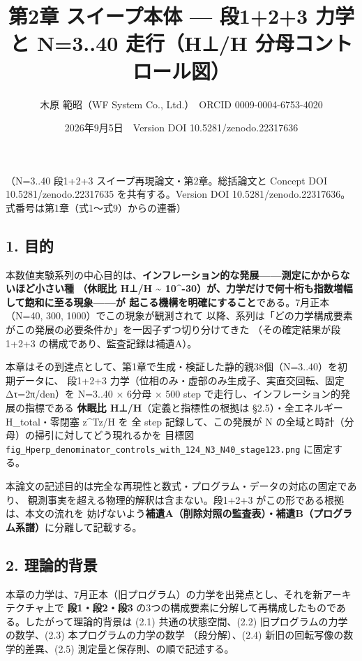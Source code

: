 \documentclass[
  a4paper,
]{ltjsarticle}
\title{第2章 スイープ本体 --- 段1+2+3 力学と N=3..40 走行（H⊥/H
分母コントロール図）}
\author{木原 範昭（WF System Co., Ltd.）　ORCID 0009-0004-6753-4020}
\date{2026年9月5日　Version DOI 10.5281/zenodo.22317636}
\begin{document}
\maketitle

（N=3..40 段1+2+3 スイープ再現論文・第2章。総括論文と Concept DOI
10.5281/zenodo.22317635 を共有する。Version DOI
10.5281/zenodo.22317636。 式番号は第1章（式1〜式9）からの連番）

\subsection{1. 目的}\label{ux76eeux7684}

本数値実験系列の中心目的は、\textbf{インフレーション的な発展------測定にかからないほど小さい種
（休眠比 H⊥/H \textasciitilde{}
10\^{}-30）が、力学だけで何十桁も指数増幅して飽和に至る現象------が
起こる機構を明確にすること}である。7月正本（N=40, 300,
1000）でこの現象が観測されて
以降、系列は「どの力学構成要素がこの発展の必要条件か」を一因子ずつ切り分けてきた
（その確定結果が段1+2+3 の構成であり、監査記録は補遺A）。

本章はその到達点として、第1章で生成・検証した静的親38個（N=3..40）を初期データに、
段1+2+3 力学（位相のみ・虚部のみ生成子、実直交回転、固定 Δτ=2π/den）を
N=3..40 × 6分母 × 500 step で走行し、インフレーション的発展の指標である
\textbf{休眠比 H⊥/H}（定義と指標性の根拠は §2.5）・全エネルギー
H\_total・零閉塞 \textbar z\^{}Tz\textbar/H を 全 step
記録して、この発展が N の全域と時計（分母）の掃引に対してどう現れるかを
目標図
\texttt{fig\_Hperp\_denominator\_controls\_with\_124\_N3\_N40\_stage123.png}
に固定する。

本論文の記述目的は完全な再現性と数式・プログラム・データの対応の固定であり、
観測事実を超える物理的解釈は含まない。段1+2+3
がこの形である根拠は、本文の流れを
妨げないよう\textbf{補遺A（削除対照の監査表）・補遺B（プログラム系譜）}に分離して記載する。

\subsection{2. 理論的背景}\label{ux7406ux8ad6ux7684ux80ccux666f}

本章の力学は、7月正本（旧プログラム）の力学を出発点とし、それを新アーキテクチャ上で
\textbf{段1・段2・段3}
の3つの構成要素に分解して再構成したものである。したがって理論的背景は
(2.1) 共通の状態空間、(2.2) 旧プログラムの力学の数学、(2.3)
本プログラムの力学の数学 （段分解）、(2.4)
新旧の回転写像の数学的差異、(2.5) 測定量と保存則、の順で記述する。
\end{document}
